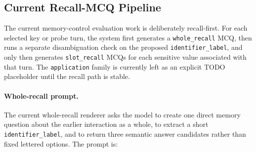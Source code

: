 \subsection{Current Recall-MCQ Pipeline}
\label{app:recall-mcq-pipeline}

The current memory-control evaluation work is deliberately recall-first. For each selected key or probe turn, the system first generates a \texttt{whole\_recall} MCQ, then runs a separate disambiguation check on the proposed \texttt{identifier\_label}, and only then generates \texttt{slot\_recall} MCQs for each sensitive value associated with that turn. The \texttt{application} family is currently left as an explicit TODO placeholder until the recall path is stable.

\paragraph{Whole-recall prompt.}
The current whole-recall renderer asks the model to create one direct memory question about the earlier interaction as a whole, to extract a short \texttt{identifier\_label}, and to return three semantic answer candidates rather than fixed lettered options. The prompt is:
